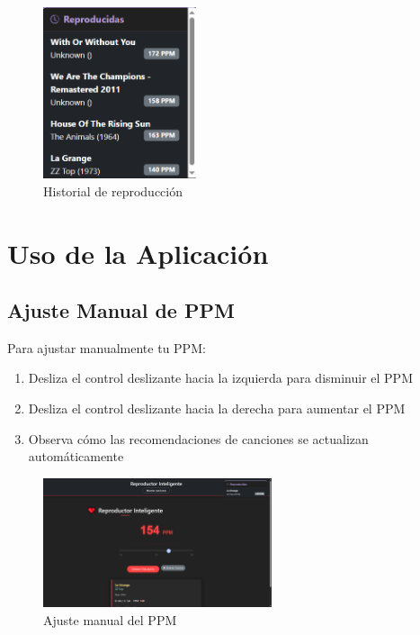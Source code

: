 \documentclass[a4paper,12pt]{article}
\begin{document}
 \begin{figure}[h]
     \centering
     \includegraphics[width=0.4\textwidth]{imagenes/historial.png}
     \caption{Historial de reproducción}
 \end{figure}

\section{Uso de la Aplicación}

\subsection{Ajuste Manual de PPM}
Para ajustar manualmente tu PPM:
\begin{enumerate}
    \item Desliza el control deslizante hacia la izquierda para disminuir el PPM
    \item Desliza el control deslizante hacia la derecha para aumentar el PPM
    \item Observa cómo las recomendaciones de canciones se actualizan automáticamente
\end{enumerate}

 \begin{figure}[h]
     \centering
     \includegraphics[width=0.6\textwidth]{imagenes/ajuste_manual.png}
     \caption{Ajuste manual del PPM}
 \end{figure}
\end{document}

